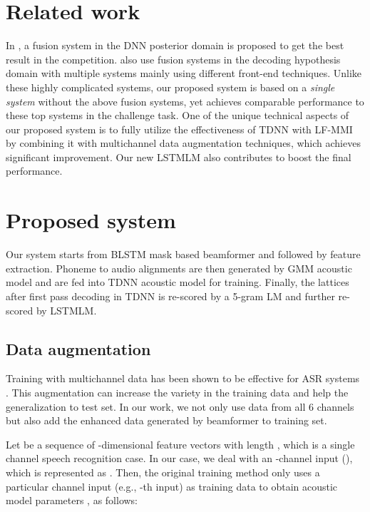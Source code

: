 \documentclass[a4paper]{article}
\begin{document}
\section{Related work}
In \cite{du2016ustc}, a fusion system in the DNN posterior domain is proposed to get the best result in the competition. 
\cite{menne2016rwth,erdogan2016multi,fujita2016unsupervised} also use fusion systems in the decoding hypothesis domain with multiple systems mainly using different front-end techniques.
Unlike these highly complicated systems, our proposed system is based on a {\it single system} without the above fusion systems, yet achieves comparable performance to these top systems in the challenge task.
One of the unique technical aspects of our proposed system is to fully utilize the effectiveness of TDNN with LF-MMI by combining it with multichannel data augmentation techniques, which achieves significant improvement.
Our new LSTMLM also contributes to boost the final performance.
\label{sec:advance}

\section{Proposed system}
\noindent Our system starts from BLSTM mask based beamformer and followed by feature extraction. Phoneme to audio alignments are then generated by GMM acoustic model and are fed into TDNN acoustic model for training. Finally, the lattices after first pass decoding in TDNN is re-scored by a 5-gram LM and further re-scored by LSTMLM.

\subsection{Data augmentation}
\label{sec:6data}
Training with multichannel data has been shown to be effective for ASR systems \cite{erdogan2016multi,barker2015third,hori2017multi}. 
This augmentation can increase the variety in the training data and help the generalization to test set. 
In our work, we not only use data from all 6 channels but also add the enhanced data generated by beamformer to training set.

Let  be a sequence of -dimensional feature vectors with length , which is a single channel speech recognition case. 
In our case, we deal with an -channel input (), which is represented as .
Then, the original training method only uses a particular channel input (e.g., -th input) as training data to obtain acoustic model parameters , as follows:
\end{document}
